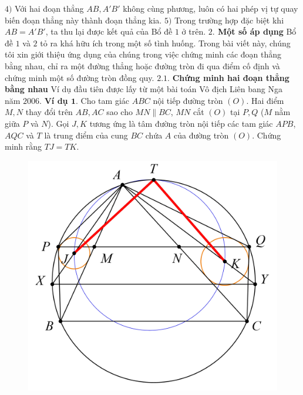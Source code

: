 \begin{multicols}{2}
\begin{figure}[H]
		\vspace*{-10pt}
	\end{figure}
	$4)$ Với hai đoạn thẳng $AB,A'B'$ không cùng phương, luôn có hai phép vị tự quay biến đoạn thẳng này thành đoạn thẳng kia.
	\vskip 0.1cm
	$5)$ Trong trường hợp đặc biệt khi $AB=A'B'$, ta thu lại được kết quả của Bổ đề $1$ ở trên.
	\vskip 0.1cm
	\textbf{\color{hoccungpi}$2.$  Một số áp dụng}
	\vskip 0.1cm
	Bổ đề $1$ và $2$ tỏ ra khá hữu ích trong một số tình huống. Trong bài viết này, chúng tôi xin giới thiệu ứng dụng của chúng trong việc chứng minh các đoạn thẳng bằng nhau, chỉ ra một đường thẳng hoặc đường tròn đi qua điểm cố định và chứng minh một số đường tròn đồng quy.
	\vskip 0.1cm
	$\pmb{2.1.}$ \textbf{\color{hoccungpi}Chứng minh hai đoạn thẳng bằng nhau}
	\vskip 0.1cm
	Ví dụ đầu tiên được lấy từ một bài toán Vô địch Liên bang Nga năm $2006$.
	\vskip 0.1cm
	\textbf{\color{hoccungpi}Ví dụ $\pmb{1.}$} Cho tam giác $ABC$ nội tiếp đường tròn $(O)$. Hai điểm $M,N$ thay đổi trên $AB,AC$ sao cho $MN \parallel BC$, $MN$ cắt $(O)$ tại  $P,Q$ ($M$ nằm giữa $P$ và $N$). Gọi $J,K$ tương ứng là tâm đường tròn nội tiếp các tam giác $APB$, $AQC$ và $T$ là trung điểm của cung $BC$ chứa $A$ của đường tròn $(O)$. Chứng minh rằng $TJ=TK$.
	\begin{figure}[H]
		\vspace*{-5pt}
		\centering
		\captionsetup{labelformat= empty, justification=centering}
		\includegraphics[width= 0.9\linewidth]{4}
		\vspace*{-10pt}
	\end{figure}

\end{multicols}
